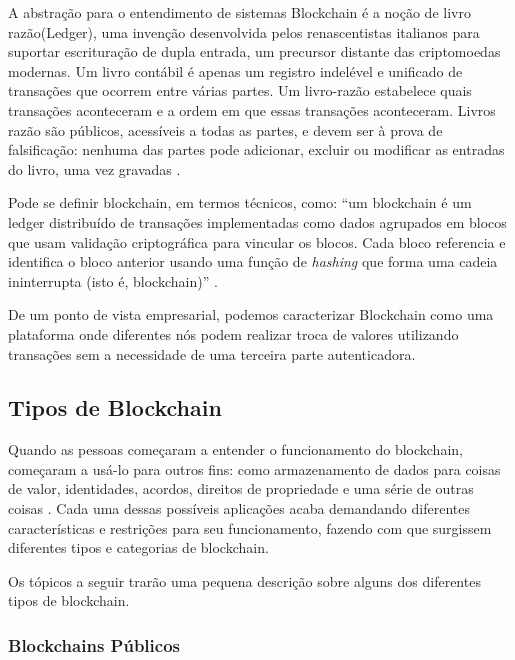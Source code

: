     A abstração para o entendimento de sistemas Blockchain é a noção de livro razão(Ledger), uma invenção desenvolvida pelos renascentistas italianos para suportar escrituração de dupla entrada, um precursor distante das criptomoedas modernas. Um livro contábil é apenas um registro indelével e unificado de transações que ocorrem entre várias partes. Um livro-razão estabelece quais transações aconteceram e a ordem em que essas transações aconteceram. Livros razão são públicos, acessíveis a todas as partes, e devem ser à prova de falsificação: nenhuma das partes pode adicionar, excluir ou modificar as entradas do livro, uma vez gravadas \cite{blockchain_computing_perspective}.
    
    Pode se definir blockchain, em termos técnicos, como: “um blockchain é um ledger distribuído de transações implementadas como dados agrupados em blocos que usam validação criptográfica para vincular os blocos. Cada bloco referencia e identifica o bloco anterior usando uma função de \textit{hashing} que forma uma cadeia ininterrupta (isto é, blockchain)” \cite{blockchain_pratical_guide}.
    
    De um ponto de vista empresarial, podemos caracterizar Blockchain como uma plataforma onde diferentes nós podem realizar troca de valores utilizando transações sem a necessidade de uma terceira parte autenticadora.
    
    
    \subsection{Tipos de Blockchain}
    \label{subsection_tipos_blockchain}

    Quando as pessoas começaram a entender o funcionamento do blockchain, começaram a usá-lo para outros fins: como armazenamento de dados para coisas de valor, identidades, acordos, direitos de propriedade e uma série de outras coisas \cite{blockchain_pratical_guide}. Cada uma dessas possíveis aplicações acaba demandando diferentes características e restrições para seu funcionamento, fazendo com que surgissem diferentes tipos e categorias de blockchain.
    
    Os tópicos a seguir trarão uma pequena descrição sobre alguns dos diferentes tipos de blockchain.
    
    
    \subsubsection{Blockchains Públicos}
    
